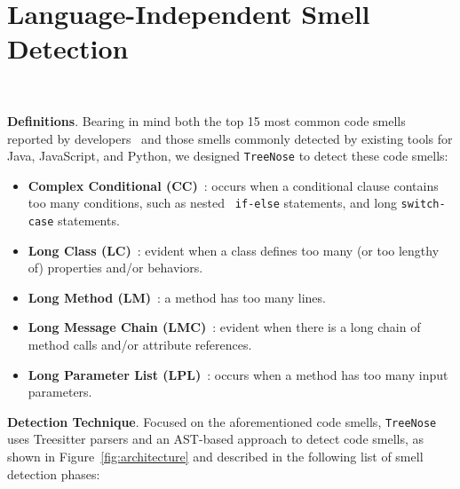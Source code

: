 


\vspace*{-0.5em}

\section{Language-Independent Smell Detection}~\label{sec:approach}

\vspace*{-1em}


{\bf Definitions}. Bearing in mind both the top 15 most common code smells
reported by developers~\cite{developersCare} and those smells commonly detected
by existing tools for Java, JavaScript, and Python, we designed
\texttt{TreeNose} to detect these code smells:

\begin{itemize}[leftmargin=*]
	\item \textbf{Complex Conditional (CC)}~\cite{Fowler_Beck}: occurs when a
	      conditional clause contains too many conditions, such as nested {\tt
			      if-else} statements, and long {\tt switch-case} statements.
	\item \textbf{Long Class (LC)}~\cite{Fowler_Beck}: evident when a class
	      defines too many (or too lengthy of) properties and/or behaviors.
	\item \textbf{Long Method (LM)}~\cite{Fowler_Beck}: a method has too many
	      lines.
	\item \textbf{Long Message Chain (LMC)}~\cite{Fowler_Beck}: evident when
	      there is a long chain of method calls and/or attribute references.
	\item \textbf{Long Parameter List (LPL)}~\cite{Fowler_Beck}: occurs when a
	      method has too many input parameters.
\end{itemize}


{\bf Detection Technique}. Focused on the aforementioned code smells,
\texttt{TreeNose} uses Treesitter parsers and an AST-based approach to detect
code smells, as shown in Figure~\ref{fig:architecture} and described in the
following list of smell detection phases:

